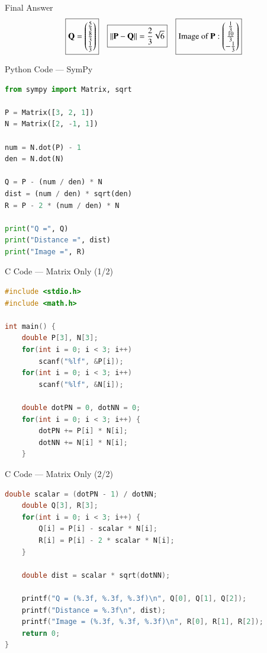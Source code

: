 \documentclass{beamer}
\begin{document}
\begin{frame}{Final Answer}
\[
\boxed{
\mathbf{Q} = \begin{pmatrix}\frac{5}{3} \\ \frac{8}{3} \\ \frac{1}{3}\end{pmatrix}
}
\quad
\boxed{
\|\mathbf{P} - \mathbf{Q}\| = \frac{2}{3} \sqrt{6}
}
\quad
\boxed{
\text{Image of } \mathbf{P}: \begin{pmatrix}\frac{1}{3} \\ \frac{10}{3} \\ -\frac{1}{3}\end{pmatrix}
}
\]
\end{frame}


\begin{frame}[fragile]{Python Code — SymPy}
\begin{lstlisting}[language=Python]
from sympy import Matrix, sqrt

P = Matrix([3, 2, 1])
N = Matrix([2, -1, 1])

num = N.dot(P) - 1
den = N.dot(N)

Q = P - (num / den) * N
dist = (num / den) * sqrt(den)
R = P - 2 * (num / den) * N

print("Q =", Q)
print("Distance =", dist)
print("Image =", R)
\end{lstlisting}
\end{frame}



\begin{frame}[fragile]{C Code — Matrix Only (1/2)}
\begin{lstlisting}[language=C]
#include <stdio.h>
#include <math.h>

int main() {
    double P[3], N[3];
    for(int i = 0; i < 3; i++)
        scanf("%lf", &P[i]);
    for(int i = 0; i < 3; i++)
        scanf("%lf", &N[i]);

    double dotPN = 0, dotNN = 0;
    for(int i = 0; i < 3; i++) {
        dotPN += P[i] * N[i];
        dotNN += N[i] * N[i];
    }
\end{lstlisting}
\end{frame}


\begin{frame}[fragile]{C Code — Matrix Only (2/2)}
\begin{lstlisting}[language=C]
    double scalar = (dotPN - 1) / dotNN;
    double Q[3], R[3];
    for(int i = 0; i < 3; i++) {
        Q[i] = P[i] - scalar * N[i];
        R[i] = P[i] - 2 * scalar * N[i];
    }

    double dist = scalar * sqrt(dotNN);

    printf("Q = (%.3f, %.3f, %.3f)\n", Q[0], Q[1], Q[2]);
    printf("Distance = %.3f\n", dist);
    printf("Image = (%.3f, %.3f, %.3f)\n", R[0], R[1], R[2]);
    return 0;
}
\end{lstlisting}
\end{frame}
\end{document}
